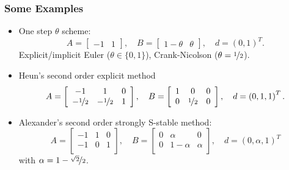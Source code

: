 \begin{frame}
\frametitle{Some Examples}
\begin{itemize}
\item One step $\theta$ scheme:
\begin{equation*}
A = \left[\begin{array}{cc}
-1 & 1
\end{array}\right],
\quad B = \left[\begin{array}{cc}
1-\theta & \theta
\end{array}\right],
\quad d = \left(
0, 1
\right)^T.
\end{equation*}
Explicit/implicit Euler ($\theta\in\{0,1\}$), Crank-Nicolson ($\theta=\nicefrac12$).
\item Heun's second order explicit method
\begin{equation*}
A = \left[\begin{array}{ccc}
-1 & 1 & 0\\
-\nicefrac12 & -\nicefrac12 & 1\\
\end{array}\right],
\quad B = \left[\begin{array}{ccc}
1 & 0 & 0\\
0 & \nicefrac12 & 0\\
\end{array}\right],
\quad d = \left(
0, 1, 1
\right)^T.
\end{equation*}
\item Alexander's second order strongly S-stable method:
\begin{equation*}
A = \left[\begin{array}{ccc}
-1 & 1 & 0\\
-1 & 0 & 1\\
\end{array}\right],
\quad B = \left[\begin{array}{ccc}
0 & \alpha     & 0\\
0 & 1-\alpha & \alpha\\
\end{array}\right],
\quad d = \left(
0, \alpha, 1
\right)^T
\end{equation*}
with $\alpha=1-\nicefrac{\sqrt{2}}{2}$.
\end{itemize}
\end{frame}


